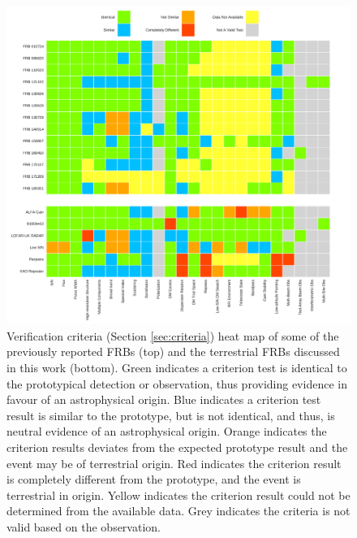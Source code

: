 \documentclass[a4paper,fleqn,usenatbib]{mnras}
\newcommand{\GSF}[1]{\noindent\textcolor{green}{GSF:#1}}
\newcommand{\dcp}[1]{\textcolor{rgb:-green!30!yellow,3;green!30!yellow,2;red,1}{ #1 --D}}
\begin{document}
\begin{figure}
    \includegraphics[width=1.0\linewidth]{verification/FRBheatmap.pdf}
    \caption{Verification criteria (Section \ref{sec:criteria}) heat map of some
    of the previously reported FRBs (top) and the terrestrial FRBs discussed in
    this work (bottom).  Green indicates a criterion test is identical to the
    prototypical detection or observation, thus providing evidence in favour of
    an astrophysical origin.  Blue indicates a criterion test result is similar
    to the prototype, but is not identical, and thus, is neutral evidence of an
    astrophysical origin.  Orange indicates the criterion results deviates from
    the expected prototype result and the event may be of terrestrial origin.
    Red indicates the criterion result is completely different from the
    prototype, and the event is terrestrial in origin. Yellow indicates the
    criterion result could not be determined from the available data.  Grey
    indicates the criteria is not valid based on the observation.
    }
    \label{fig:heat_map}
\end{figure}
\end{document}
